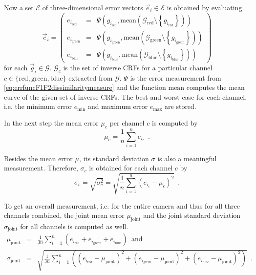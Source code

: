 Now a set $\mathcal{E}$ of three-dimensional error vectors $\vec{e}_i \in \mathcal{E}$ is obtained by evaluating
\begin{equation}
	\vec{e}_i = 
	\begin{pmatrix}
		e_{i_\text{red}}   &=& \Psi \left( g_{i_\text{red}}, \mathrm{mean} \left( \mathcal{G}_\text{red} \setminus \left\{ g_{i_\text{red}} \right\} \right) \right) \\
		e_{i_\text{green}} &=& \Psi \left( g_{i_\text{green}}, \mathrm{mean} \left( \mathcal{G}_\text{green} \setminus \left\{ g_{i_\text{green}} \right\} \right) \right) \\
		e_{i_\text{blue}}  &=& \Psi \left( g_{i_\text{blue}}, \mathrm{mean} \left( \mathcal{G}_\text{blue} \setminus \left\{ g_{i_\text{blue}} \right\} \right) \right)
	\end{pmatrix}
	\label{eq:errorVector}
\end{equation}
for each $\vec{g}_i \in \mathcal{G}$. $\mathcal{G}_c$ is the set of inverse CRFs for a particular channel $c \in \{\text{red}, \text{green}, \text{blue}\}$ extracted from $\mathcal{G}$. $\Psi$ is the error measurement from \autoref{eq:errfuncF1F2dissimilaritymeasure} and the function $\mathrm{mean}$ computes the mean curve of the given set of inverse CRFs. The best and worst case for each channel, \hbox{i.e.} the minimum error $e_\text{min}$ and maximum error $e_\text{max}$ are stored.

In the next step the mean error $\mu_c$ per channel $c$ is computed by 
\begin{equation}
	\mu_c = \frac{1}{n} \sum\limits_{i=1}^{n} e_{i_c} \enspace .
	\label{eq:meanErrorComputationPerChannel}
\end{equation}

Besides the mean error $\mu$, its standard deviation $\sigma$ is also a meaningful measurement. Therefore, $\sigma_c$ is obtained for each channel $c$ by
\begin{equation}
	\sigma_c = \sqrt{\sigma_c^2} = \sqrt{ \frac{1}{n} \sum\limits_{i=1}^{n} \left( e_{i_c} - \mu_c \right)^2 } \enspace .
	\label{eq:stddev}
\end{equation}

To get an overall measurement, \hbox{i.e.} for the entire camera and thus for all three channels combined, the joint mean error $\mu_\text{joint}$ and the joint standard deviation $\sigma_\text{joint}$ for all channels is computed as well.
\begin{eqnarray}
	\mu_\text{joint}    &=& \frac{1}{3 n} \sum\limits_{i=1}^{n} \left( e_{i_\text{red}} + e_{i_\text{green}} + e_{i_\text{blue}} \right) \enspace \text{and} \\
	\label{eq:meanErrorJoint}
	\sigma_\text{joint} &=& \sqrt{ \frac{1}{3 n} \sum\limits_{i=1}^{n} \left( \left( e_{i_\text{red}} - \mu_\text{joint} \right)^2 + \left( e_{i_\text{green}} - \mu_\text{joint} \right)^2 + \left( e_{i_\text{blue}} - \mu_\text{joint} \right)^2 \right) } \enspace .
	\label{eq:StdDevJoint}
\end{eqnarray}



